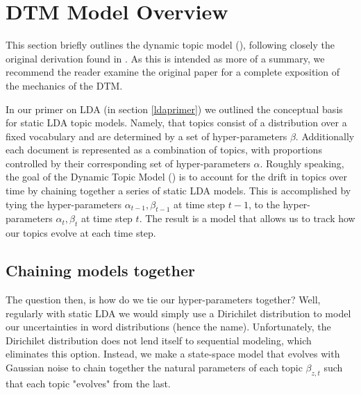 \section{DTM Model Overview}

This section briefly outlines the dynamic topic model (), following closely the original derivation found in \parencite{Blei:2006:DTM:1143844.1143859}. As this is intended as more of a summary, we recommend the reader examine the original paper for a complete exposition of the mechanics of the DTM. 

In our primer on LDA (in section \ref{ldaprimer}) we outlined the conceptual basis for static LDA topic models. Namely, that topics consist of a distribution over a fixed vocabulary and are determined by a set of hyper-parameters $\beta$. Additionally each document is represented as a combination of topics, with proportions controlled by their corresponding set of hyper-parameters $\alpha$. Roughly speaking, the goal of the Dynamic Topic Model () is to account for the drift in topics over time by chaining together a series of static LDA models. This is accomplished by tying the hyper-parameters $\alpha_{t-1}, \beta_{t-1}$ at time step $t-1$, to the hyper-parameters $\alpha_{t}, \beta_t$ at time step $t$. The result is a model that allows us to track how our topics evolve at each time step. 




\subsection{Chaining models together}

The question then, is how do we tie our hyper-parameters together? Well, regularly with static LDA we would simply use a Dirichilet distribution to model our uncertainties in word distributions (hence the name). Unfortunately, the Dirichilet distribution does not lend itself to sequential modeling, which eliminates this option. Instead, we make a state-space model that evolves with Gaussian noise to chain together the natural parameters of each topic $\beta_{z,t}$ such that each topic "evolves" from the last.

